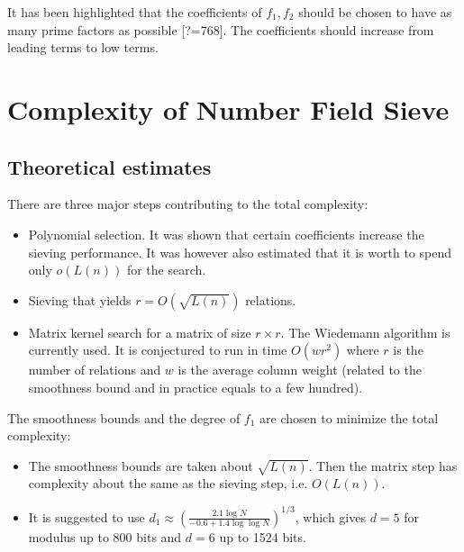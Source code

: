 \documentclass[a4paper]{article}
\begin{document}
It has been highlighted that the coefficients of $f_1,f_2$ should be chosen to have as many prime factors as possible [?=768].  The coefficients should increase from leading terms to low terms.


\section{Complexity of Number Field Sieve}

\subsection{Theoretical estimates}
There are three major steps contributing to the total complexity:
\begin{itemize}
    \item Polynomial selection. It was shown that certain coefficients increase the sieving performance. It was however also estimated that it is worth to spend only $o(L(n))$ for the search.
    \item Sieving that yields $r=O(\sqrt{L(n)})$ relations. 
    \item Matrix kernel search for a matrix of size $r\times r$. The Wiedemann algorithm is currently used. It is conjectured to run in time $O(wr^2)$ where $r$ is the number of relations and $w$ is the average column weight (related to the smoothness bound and in practice equals to a few hundred).
\end{itemize}
The smoothness bounds and the degree of $f_1$ are chosen to minimize the total complexity:
\begin{itemize}
    \item The smoothness bounds are taken about $\sqrt{L(n)}$. Then the matrix step has complexity about the same as the sieving step, i.e. $O(L(n))$.
    \item It is suggested to use 
$d_1 \approx \left(\frac{2.1\log N}{-0.6+1.4\log \log N }\right)^{1/3}$, which gives $d=5$ for modulus up to 800 bits and $d=6$ up to 1524 bits. 
\end{itemize}
\end{document}
